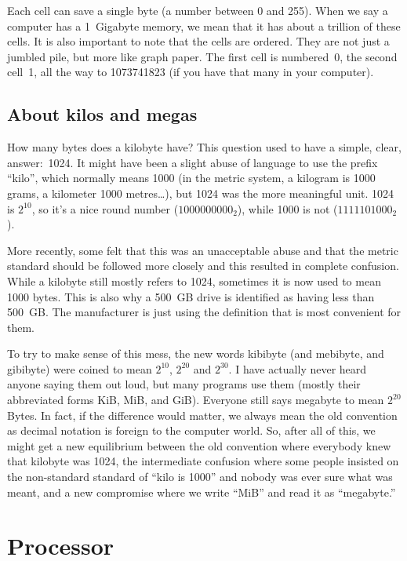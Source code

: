 Each cell can save a single byte (a number between 0 and 255). When we say a
computer has a 1~Gigabyte memory, we mean that it has about a trillion of these
cells. It is also important to note that the cells are ordered. They are not
just a jumbled pile, but more like graph paper. The first cell is numbered~0,
the second cell~1, all the way to 1073741823 (if you have that many in your
computer).

\subsection{About kilos and megas}

How many bytes does a kilobyte have? This question used to have a simple,
clear, answer:~1024. It might have been a slight abuse of language to use the
prefix ``kilo'', which normally means 1000 (in the metric system, a kilogram is
1000 grams, a kilometer 1000 metres\ldots), but 1024 was the more meaningful
unit. 1024 is $2^{10}$, so it's a nice round number ($1000000000_2$), while
1000 is not ($1111101000_2$).

More recently, some felt that this was an unacceptable abuse and that the
metric standard should be followed more closely and this resulted in complete
confusion. While a kilobyte still mostly refers to 1024, sometimes it is now
used to mean 1000 bytes. This is also why a 500~GB drive is identified as
having less than 500~GB. The manufacturer is just using the definition that is
most convenient for them.

To try to make sense of this mess, the new words kibibyte (and mebibyte, and
gibibyte) were coined to mean $2^{10}$, $2^{20}$ and $2^{30}$. I have actually
never heard anyone saying them out loud, but many programs use them
(mostly their abbreviated forms KiB, MiB, and GiB). Everyone still says
megabyte to mean $2^{20}$ Bytes. In fact, if the difference would matter, we
always mean the old convention as decimal notation is foreign to the computer
world. So, after all of this, we might get a new equilibrium between the old
convention where everybody knew that kilobyte was 1024, the intermediate
confusion where some people insisted on the non-standard standard of ``kilo is
1000'' and nobody was ever sure what was meant, and a new compromise where we
write ``MiB'' and read it as ``megabyte.''

\section{Processor}

